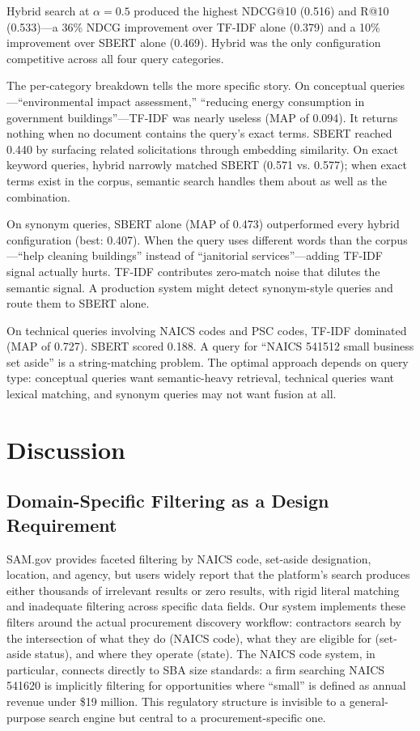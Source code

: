 \documentclass[10pt,twocolumn]{article}
\begin{document}
Hybrid search at $\alpha = 0.5$ produced the highest NDCG@10 (0.516) and R@10 (0.533)---a 36\% NDCG improvement over TF-IDF alone (0.379) and a 10\% improvement over SBERT alone (0.469). Hybrid was the only configuration competitive across all four query categories.

The per-category breakdown tells the more specific story. On conceptual queries---``environmental impact assessment,'' ``reducing energy consumption in government buildings''---TF-IDF was nearly useless (MAP of 0.094). It returns nothing when no document contains the query's exact terms. SBERT reached 0.440 by surfacing related solicitations through embedding similarity. On exact keyword queries, hybrid narrowly matched SBERT (0.571 vs. 0.577); when exact terms exist in the corpus, semantic search handles them about as well as the combination.

On synonym queries, SBERT alone (MAP of 0.473) outperformed every hybrid configuration (best: 0.407). When the query uses different words than the corpus---``help cleaning buildings'' instead of ``janitorial services''---adding TF-IDF signal actually hurts. TF-IDF contributes zero-match noise that dilutes the semantic signal. A production system might detect synonym-style queries and route them to SBERT alone.

On technical queries involving NAICS codes and PSC codes, TF-IDF dominated (MAP of 0.727). SBERT scored 0.188. A query for ``NAICS 541512 small business set aside'' is a string-matching problem. The optimal approach depends on query type: conceptual queries want semantic-heavy retrieval, technical queries want lexical matching, and synonym queries may not want fusion at all.

\section{Discussion}

\subsection{Domain-Specific Filtering as a Design Requirement}

SAM.gov provides faceted filtering by NAICS code, set-aside designation, location, and agency, but users widely report that the platform's search produces either thousands of irrelevant results or zero results, with rigid literal matching and inadequate filtering across specific data fields. Our system implements these filters around the actual procurement discovery workflow: contractors search by the intersection of what they do (NAICS code), what they are eligible for (set-aside status), and where they operate (state). The NAICS code system, in particular, connects directly to SBA size standards: a firm searching NAICS 541620 is implicitly filtering for opportunities where ``small'' is defined as annual revenue under \$19 million. This regulatory structure is invisible to a general-purpose search engine but central to a procurement-specific one.
\end{document}
